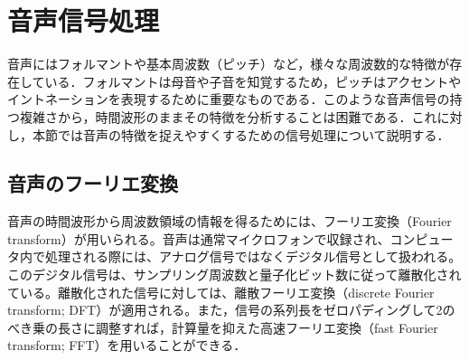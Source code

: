 \section{音声信号処理}
音声にはフォルマントや基本周波数（ピッチ）など，様々な周波数的な特徴が存在している．フォルマントは母音や子音を知覚するため，ピッチはアクセントやイントネーションを表現するために重要なものである．このような音声信号の持つ複雑さから，時間波形のままその特徴を分析することは困難である．これに対し，本節では音声の特徴を捉えやすくするための信号処理について説明する．

\subsection{音声のフーリエ変換}
音声の時間波形から周波数領域の情報を得るためには、フーリエ変換（Fourier transform）が用いられる。音声は通常マイクロフォンで収録され、コンピュータ内で処理される際には、アナログ信号ではなくデジタル信号として扱われる。このデジタル信号は、サンプリング周波数と量子化ビット数に従って離散化されている。離散化された信号に対しては、離散フーリエ変換（discrete Fourier transform; DFT）が適用される。また，信号の系列長をゼロパディングして2のべき乗の長さに調整すれば，計算量を抑えた高速フーリエ変換（fast Fourier transform; FFT）を用いることができる．

